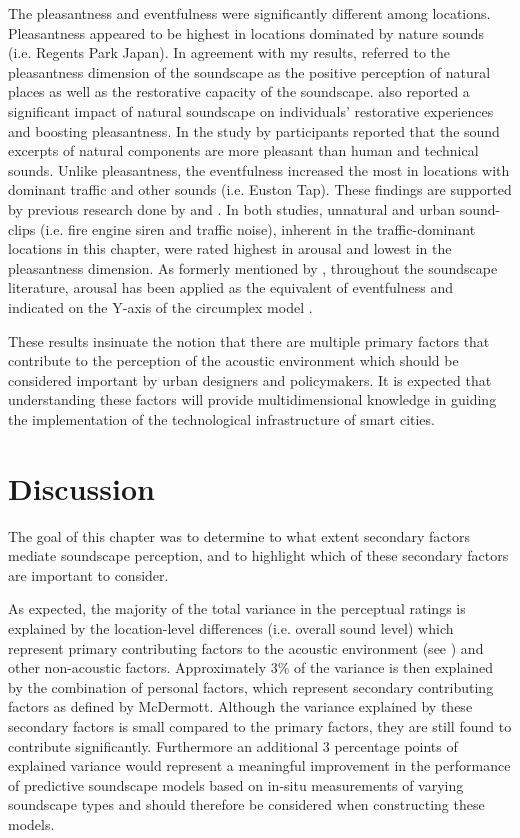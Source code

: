 The pleasantness and eventfulness were significantly different among locations. Pleasantness appeared to be highest in locations dominated by nature sounds (i.e. Regents Park Japan). In agreement with my results, \citet{Payne2013production} referred to the pleasantness dimension of the soundscape as the positive perception of natural places as well as the restorative capacity of the soundscape. \citet{Zhang2014Research} also reported a significant impact of natural soundscape on individuals' restorative experiences and boosting pleasantness. In the study by \citet{Axelsson2010principal} participants reported that the sound excerpts of natural components are more pleasant than human and technical sounds. Unlike pleasantness, the eventfulness increased the most in locations with dominant traffic and other sounds (i.e. Euston Tap). These findings are supported by previous research done by \citet{Bradley2000Emotion} and \citet{Hume2013Physiological}. In both studies, unnatural and urban sound-clips (i.e. fire engine siren and traffic noise), inherent in the traffic-dominant locations in this chapter, were rated highest in arousal and lowest in the pleasantness dimension. As formerly mentioned by \citet{Erfanian2019Psychophysiological}, throughout the soundscape literature, arousal has been applied as the equivalent of eventfulness and indicated on the Y-axis of the circumplex model \citep{Axelsson2010principal,Erfanian2019Psychophysiological}.


These results insinuate the notion that there are multiple primary factors \citep{Bradley2000Emotion} that contribute to the perception of the acoustic environment which should be considered important by urban designers and policymakers. It is expected that understanding these factors will provide multidimensional knowledge in guiding the implementation of the technological infrastructure of smart cities.

\section{Discussion}
The goal of this chapter was to determine to what extent secondary factors mediate soundscape perception, and to highlight which of these secondary factors are important to consider. 

As expected, the majority of the total variance in the perceptual ratings is explained by the location-level differences (i.e. overall sound level) which represent primary contributing factors to the acoustic environment (see \citep{McDermott2012Auditory}) and other non-acoustic factors. Approximately 3\% of the variance is then explained by the combination of personal factors, which represent secondary contributing factors as defined by McDermott. Although the variance explained by these secondary factors is small compared to the primary factors, they are still found to contribute significantly. Furthermore an additional 3 percentage points of explained variance would represent a meaningful improvement in the performance of predictive soundscape models based on in-situ measurements of varying soundscape types \citep{Lionello2020systematic} and should therefore be considered when constructing these models.

